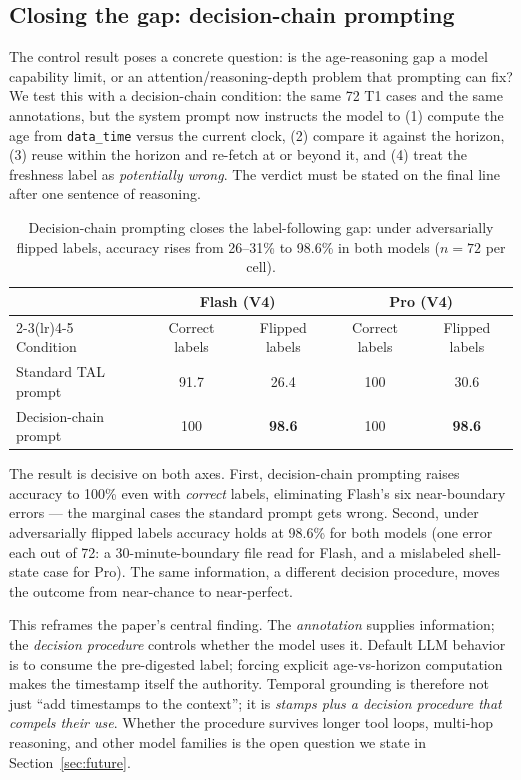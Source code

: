\documentclass[10pt]{article}
\begin{document}
\subsection{Closing the gap: decision-chain prompting}
\label{sec:decisionchain}

The control result poses a concrete question: is the age-reasoning gap a model
capability limit, or an attention/reasoning-depth problem that prompting can fix?
We test this with a decision-chain condition: the same 72 T1 cases and the same
annotations, but the system prompt now instructs the model to (1) compute the age
from \texttt{data\_time} versus the current clock, (2) compare it against the
horizon, (3) reuse within the horizon and re-fetch at or beyond it, and (4) treat
the freshness label as \emph{potentially wrong}. The verdict must be stated on the
final line after one sentence of reasoning.

\begin{table}[h]
  \centering
  \small
  \begin{tabular}{lcccc}
    \toprule
    & \multicolumn{2}{c}{Flash (V4)} & \multicolumn{2}{c}{Pro (V4)} \\
    \cmidrule(lr){2-3}\cmidrule(lr){4-5}
    Condition & Correct labels & Flipped labels & Correct labels & Flipped labels \\
    \midrule
    Standard TAL prompt & 91.7 & 26.4 & 100 & 30.6 \\
    Decision-chain prompt & 100 & \textbf{98.6} & 100 & \textbf{98.6} \\
    \bottomrule
  \end{tabular}
  \caption{Decision-chain prompting closes the label-following gap: under
  adversarially flipped labels, accuracy rises from 26--31\% to 98.6\% in both
  models ($n{=}72$ per cell).}
  \label{tab:decisionchain}
\end{table}

The result is decisive on both axes. First, decision-chain prompting raises
accuracy to 100\% even with \emph{correct} labels, eliminating Flash's six
near-boundary errors --- the marginal cases the standard prompt gets wrong.
Second, under adversarially flipped labels accuracy holds at 98.6\% for both
models (one error each out of 72: a 30-minute-boundary file read for Flash, and a
mislabeled shell-state case for Pro). The same information, a different decision
procedure, moves the outcome from near-chance to near-perfect.

This reframes the paper's central finding. The \emph{annotation} supplies
information; the \emph{decision procedure} controls whether the model uses it.
Default LLM behavior is to consume the pre-digested label; forcing explicit
age-vs-horizon computation makes the timestamp itself the authority. Temporal
grounding is therefore not just ``add timestamps to the context''; it is
\emph{stamps plus a decision procedure that compels their use}. Whether the
procedure survives longer tool loops, multi-hop reasoning, and other model
families is the open question we state in Section~\ref{sec:future}.
\end{document}
